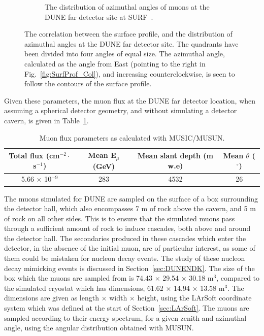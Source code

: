 \begin{figure}
\begin{subfigure}{0.4\textwidth}
    \caption{The distribution of azimuthal angles of muons at the DUNE far detector site at SURF~\citep{MartinsThesis}.}
    \label{fig:SurfProf_Azi}
  \end{subfigure}%
  \caption[The correlation between the surface profile, and the distribution of azimuthal angles at the DUNE far detector site]
          {The correlation between the surface profile, and the distribution of azimuthal angles at the DUNE far detector site. The quadrants have been divided into four angles of equal size. The azimuthal angle, calculated as the angle from East (pointing to the right in Fig.~\ref{fig:SurfProf_Col}), and increasing counterclockwise, is seen to follow the contours of the surface profile.}
\end{figure}

Given these parameters, the muon flux at the DUNE far detector location, when assuming a spherical detector geometry, and without simulating a detector cavern, is given in Table~\ref{tab:MUSUNflux}. \\
\begin{table}
  \caption[Muon flux parameters as calculated with MUSIC/MUSUN.]
          {Muon flux parameters as calculated with MUSIC/MUSUN.}
  \centering
  \label{tab:MUSUNflux}
  \begin{tabular}{c c c c}
    \toprule
        {Total flux (cm$^{-2}\cdot$s$^{-1}$)} & {Mean E$_{\mu}$ (GeV)} & {Mean slant depth (m w.e)} & {Mean $\theta$ ($^{\circ}$)} \\ 
        \midrule
        5.66 $\times$ 10$^{-9}$           & 283                    & 4532                       & 26                           \\
    \bottomrule
  \end{tabular}
\end{table}

The muons simulated for DUNE are sampled on the surface of a box surrounding the detector hall, which also encompasses 7 m of rock above the cavern, and 5 m of rock on all other sides. This is to ensure that the simulated muons pass through a sufficient amount of rock to induce cascades, both above and around the detector hall. The secondaries produced in these cascades which enter the detector, in the absence of the initial muon, are of particular interest, as some of them could be mistaken for nucleon decay events. The study of these nucleon decay mimicking events is discussed in Section~\ref{sec:DUNENDK}. The size of the box which the muons are sampled from is 74.43 $\times$ 29.54 $\times$ 30.18 m$^3$, compared to the simulated cryostat which has dimensions, 61.62 $\times$ 14.94 $\times$ 13.58 m$^3$. The dimensions are given as length $\times$ width $\times$ height, using the LArSoft coordinate system which was defined at the start of Section~\ref{sec:LArSoft}. The muons are sampled according to their energy spectrum, for a given zenith and azimuthal angle, using the angular distribution obtained with MUSUN. \\

